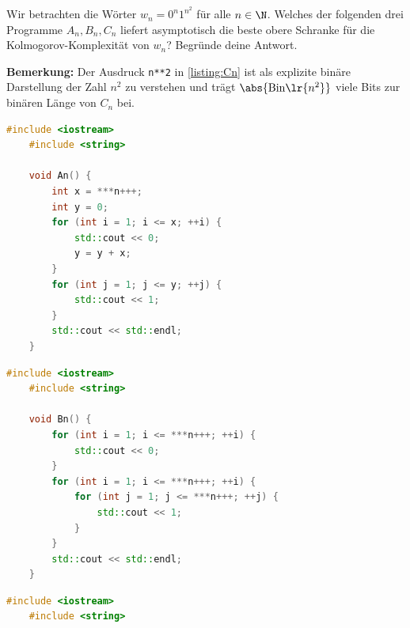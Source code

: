 \begin{questions}
	\question[2] Wir betrachten die Wörter $w_n = 0^n1^{n^2}$ für alle $n\in\N$. Welches der folgenden drei Programme $A_n, B_n, C_n$ liefert asymptotisch die beste obere Schranke für die Kolmogorov-Komplexität von $w_n$? Begründe deine Antwort.

	\textbf{Bemerkung:} Der Ausdruck \verb|n**2| in \cref{listing:Cn} ist als explizite binäre Darstellung der Zahl $n^2$ zu verstehen und trägt $\abs{\text{Bin}\lr{n^2}}$ viele Bits zur binären Länge von $C_n$ bei.
\begin{lstlisting}[language=C++,caption=$A_n$]
    #include <iostream>
    #include <string>
    
    void An() {
        int x = ***n+++;
        int y = 0;
        for (int i = 1; i <= x; ++i) {
            std::cout << 0;
            y = y + x;
        }
        for (int j = 1; j <= y; ++j) {
            std::cout << 1;
        }
        std::cout << std::endl;
    }
\end{lstlisting}

\begin{lstlisting}[language=C++,caption=$B_n$]
    #include <iostream>
    #include <string>
    
    void Bn() {
        for (int i = 1; i <= ***n+++; ++i) {
            std::cout << 0;
        }
        for (int i = 1; i <= ***n+++; ++i) {
            for (int j = 1; j <= ***n+++; ++j) {
                std::cout << 1;
            }
        }
        std::cout << std::endl;
    }
\end{lstlisting}

\begin{lstlisting}[language=C++,caption=$C_n$,label=listing:Cn]
    #include <iostream>
    #include <string>
    

\end{lstlisting}
\end{questions}
